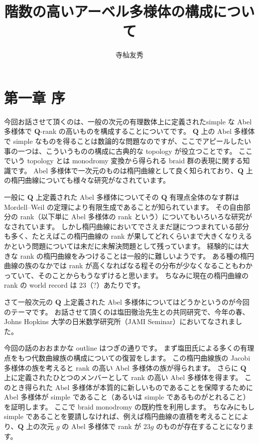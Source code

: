 \documentclass[uplatex,dvipdfmx]{jlreq}
\begin{document}
\title{階数の高いアーベル多様体の構成について}
\author{寺杣友秀}
\date{}
\maketitle


\section*{第一章 序}

今回お話させて頂くのは、一般の次元の有理数体上に定義されたsimple な Abel 多様体で $\mathbf{Q}$-rank の高いものを構成することについてです。
$\mathbf{Q}$ 上の Abel 多様体で simple なものを得ることは数論的な問題なのですが、ここでアピールしたい事の一つは、こういうものの構成に古典的な topology が役立つことです。
ここでいう topology とは monodromy 変換から得られる braid 群の表現に関する知識です。
Abel 多様体で一次元のものは楕円曲線として良く知られており、$\mathbf{Q}$ 上の楕円曲線についても様々な研究がなされています。

一般に $\mathbf{Q}$ 上定義された Abel 多様体についてその $\mathbf{Q}$ 有理点全体のなす群は Mordell--Weil の定理により有限生成であることが知られています。
その自由部分の rank（以下単に Abel 多様体の rank という）についてもいろいろな研究がなされています。
しかし楕円曲線においてでさえまだ謎につつまれている部分も多く、たとえばこの楕円曲線の rank が果してどれくらいまで大きくなりえるかという問題については未だに未解決問題として残っています。
経験的には大きな rank の楕円曲線をみつけることは一般的に難しいようです。
ある種の楕円曲線の族のなかでは rank が高くなればなる程その分布が少なくなることもわかっていて、そのことからもうなずけると思います。
ちなみに現在の楕円曲線の rank の world record は 23（?）あたりです。

さて一般次元の $\mathbf{Q}$ 上定義された Abel 多様体についてはどうかというのが今回のテーマです。
お話させて頂くのは塩田徹治先生との共同研究で、今年の春、Johns Hopkins 大学の日米数学研究所（JAMI Seminar）においてなされました。

今回の話のおおまかな outline はつぎの通りです。
まず塩田氏による多くの有理点をもつ代数曲線族の構成についての復習をします。
この楕円曲線族の Jacobi 多様体の族を考えると rank の高い Abel 多様体の族が得られます。
さらに $\mathbf{Q}$ 上に定義されたひとつのメンバーとして rank の高い Abel 多様体を得ます。
このとき得られた Abel 多様体が本質的に新しいものであることを保障するために Abel 多様体が simple であること（あるいは simple であるものがとれること）を証明します。
ここで braid monodromy の既約性を利用します。
ちなみにもし simple であることを要請しなければ、例えば楕円曲線の直積を考えることにより、$\mathbf{Q}$ 上の次元 $g$ の Abel 多様体で rank が $23g$ のものが存在することになります。
\end{document}
